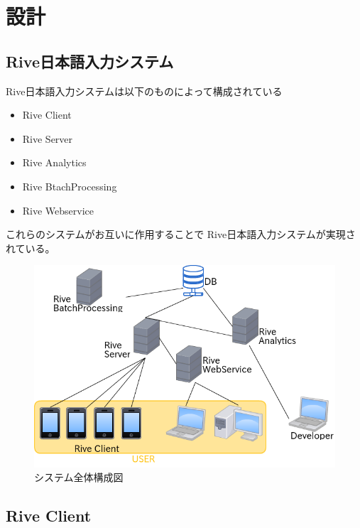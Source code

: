 \chapter{設計}
\label{chap:design}

\section{Rive日本語入力システム}

Rive日本語入力システムは以下のものによって構成されている

\begin{itemize}
  \item Rive Client
  \item Rive Server
  \item Rive Analytics
  \item Rive BtachProcessing
  \item Rive Webservice
\end{itemize}

これらのシステムがお互いに作用することで
Rive日本語入力システムが実現されている。

\begin{figure}[htbp]
  \begin{center}
    \includegraphics[width=12cm,bb=0 0 540 448]{images/systemstructure.png}
  \end{center}
  \caption{システム全体構成図}
  \label{fig:systemstructure}
\end{figure}





\section{Rive Client}
